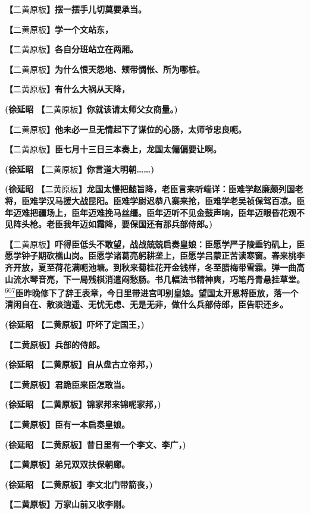\textbf{【}二黄原板\textbf{】摆一摆手儿切莫要承当。}

\textbf{【}二黄原板\textbf{】学一个文站东，}

\textbf{【}二黄原板\textbf{】各自分班站立在两厢。}

\textbf{【}二黄原板\textbf{】为什么恨天怨地、颊带惆怅、所为哪桩。}

\textbf{【}二黄原板\textbf{】有什么大祸从天降，}

\textbf{(徐延昭 【}二黄原板\textbf{】你就该请太师父女商量。)}

\textbf{【}二黄原板\textbf{】他未必一旦无情起下了谋位的心肠，太师爷忠良呃。}

\textbf{【}二黄原板\textbf{】臣七月十三日三本奏上，龙国太偏偏要让啊。}

\textbf{(徐延昭 【}二黄原板\textbf{】你言道大明朝\ldots{}\ldots{})}

\textbf{(徐延昭
【}二黄原板\textbf{】龙国太慢把懿旨降，老臣言来听端详：臣难学赵廉颇列国老将，臣难学汉马援大战昆阳。臣难学尉迟恭八寨来抢，臣难学老吴祯保驾百凉。臣年迈难把疆场上，臣年迈难挽马丝缰。臣年迈听不见金鼓声响，臣年迈眼昏花观不见阵头枪。老臣我年迈如霜降，要保国还有那兵部侍郎。)}

\textbf{【}二黄原板\textbf{】吓得臣低头不敢望，战战兢兢启奏皇娘：臣愿学严子陵垂钓矶上，臣愿学钟子期砍樵山岗。臣愿学诸葛亮躬耕垄上，臣愿学吕蒙正苦读寒窗。春来桃李齐开放，夏至荷花满呃池塘。到秋来菊桂花开金钱样，冬至腊梅带雪霜。弹一曲高山流水琴音亮，下一局残棋消遣闷愁肠。书几幅法书精神爽，巧笔丹青悬挂草堂。}\protect\hyperlink{fn607}{\textsuperscript{607}}\textbf{臣昨晚修下了辞王表章，今日里带进宫叩别皇娘。望国太开恩将臣放，落一个清闲自在、散淡逍遥、无忧无虑、无是无非，做什么兵部侍郎，臣告职还乡。}

\textbf{(徐延昭 【二黄原板】吓坏了定国王，)}

\textbf{【二黄原板】兵部的侍郎。}

\textbf{(徐延昭 【二黄原板】自从盘古立帝邦，)}

\textbf{【二黄原板】君跪臣来臣怎敢当。}

\textbf{(徐延昭 【二黄原板】锦家邦来锦呢家邦，)}

\textbf{【二黄原板】臣有一本启奏皇娘。}

\textbf{(徐延昭 【二黄原板】昔日里有一个李文、李广，)}

\textbf{【二黄原板】弟兄双双扶保朝廊。}

\textbf{(徐延昭 【二黄原板】李文北门带箭丧，)}

\textbf{【二黄原板】万家山前又收李刚。}

